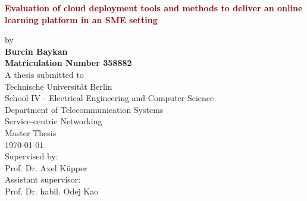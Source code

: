 \documentclass[twoside,11pt,titlepage,a4paper,english,bibliography=totocnumbered,listof=numbered]{scrbook}
\begin{document}
\frontmatter


\begin{titlepage}
	\strut
	\hfill
	\begin{center}
	\vspace{1cm}
		\Huge
		\begin{spacing}{.9}
			\textcolor{DarkRed}{\textbf{Evaluation of cloud deployment tools and methods to deliver an online learning platform in an SME setting}}\\
		\end{spacing}
		\vspace{0.8cm}
		\large
		by\\
		\vspace{0.8cm}
		\textbf{Burcin Baykan}\\
		\vspace{0.8cm}
		\textbf{Matriculation Number 358882}\\
		\vspace{2cm}
	 	A thesis submitted to\\
		\vspace{0.5cm}
		Technische Universität Berlin\\
		School IV - Electrical Engineering and Computer Science\\
		Department of Telecommunication Systems\\
		Service-centric Networking\\
		\vspace{0.5cm}
		Master Thesis\\
		\vspace{2.2cm}
		\today\\
		\vspace{2.0cm}
		\large
		Supervised by:\\
		Prof. Dr. Axel Küpper\\
		\vspace{1cm}
		Assistant supervisor:\\
		Prof. Dr. habil. Odej Kao
		\end{center}
\end{titlepage}
\thispagestyle{empty}
\end{document}
